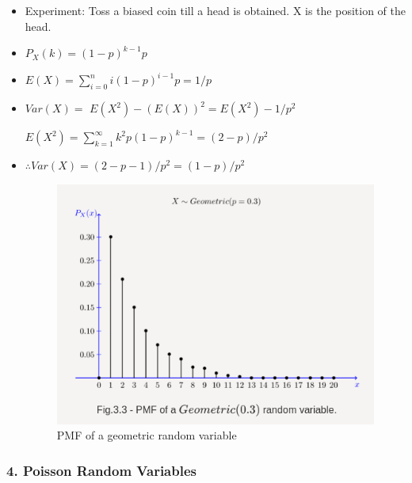 \begin{itemize}
\item
  Experiment: Toss a biased coin till a head is obtained. X is the
  position of the head.
\item
  \(P_X(k) = (1-p)^{k-1}p\)
\item
  \(E(X) = \displaystyle\sum_{i=0}^{n}i(1-p)^{i-1}p = 1/p\)
\item
  \(Var(X) =\) \(E(X^2) - (E(X))^2=E(X^2) -1/p^2\)

  \(E(X^2) = \displaystyle\sum_{k=1}^{\infty}k^2p(1-p)^{k-1}=(2-p)/p^2\)
\item
  \(\therefore Var(X) = (2-p-1)/p^2 = (1-p)/p^2\)

  \begin{figure}
  \centering
  \includegraphics{Lecture 13 Notes e842fef9a3e0449fa78bac59b75dbc5c/Screenshot_from_2021-08-06_23-12-50.png}
  \caption{PMF of a geometric random variable}
  \end{figure}
\end{itemize}

\hypertarget{poisson-random-variables}{%
\subsubsection{4. Poisson Random
Variables}\label{poisson-random-variables}}


